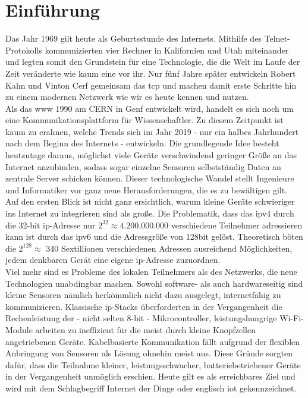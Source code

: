 \section{Einführung}

	Das Jahr 1969 gilt heute als Geburtsstunde des Internets. Mithilfe des Telnet-Protokolls kommunizierten vier Rechner in Kalifornien und Utah miteinander und legten somit den Grundstein für eine Technologie, die die Welt im Laufe der Zeit veränderte wie kaum eine vor ihr. \cite{lmzgeschichte} Nur fünf Jahre später entwickeln Robert Kahn und Vinton Cerf gemeinsam das \ac{tcp} und machen damit erste Schritte hin zu einem modernen Netzwerk wie wir es heute kennen und nutzen.\\
	Als das \ac{www} 1990 am CERN in Genf entwickelt wird, handelt es sich noch um eine Kommunikationsplattform für Wissenschaftler. Zu diesem Zeitpunkt ist kaum zu erahnen, welche Trends sich im Jahr 2019 - nur ein halbes Jahrhundert nach dem Beginn des Internets - entwickeln. Die grundlegende Idee besteht heutzutage daraus, möglichst viele Geräte verschwindend geringer Größe an das Internet anzubinden, sodass sogar einzelne Sensoren selbstständig Daten an zentrale Server schicken können. Dieser technologische Wandel stellt Ingenieure und Informatiker vor ganz neue Herausforderungen, die es zu bewältigen gilt. \\
	Auf den ersten Blick ist nicht ganz ersichtlich, warum kleine Geräte schwieriger ins Internet zu integrieren sind als große. Die Problematik, dass das \ac{ipv4} durch die 32-bit \ac{ip}-Adresse nur $2^32\approx4.200.000.000$ verschiedene Teilnehmer adressieren kann ist durch das \ac{ipv6} und die Adressgröße von 128bit gelöst. Theoretisch böten die $2^128\approx$ 340 Sextillionen verschiedenen Adressen ausreichend Möglichkeiten, jedem denkbaren Gerät eine eigene \ac{ip}-Adresse zuzuordnen.\\
	Viel mehr sind es Probleme des lokalen Teilnehmers als des Netzwerks, die neue Technologien unabdingbar machen. Sowohl software- als auch hardwareseitig sind kleine Sensoren nämlich herkömmlich nicht dazu ausgelegt, internetfähig zu kommunizieren. Klassische \ac{ip}-Stacks überforderten in der Vergangenheit die Rechenleistung der - nicht selten 8-bit - Mikrocontroller, leistungshungrige Wi-Fi-Module arbeiten zu ineffizient für die meist durch kleine Knopfzellen angetriebenen Geräte. Kabelbasierte Kommunikation fällt aufgrund der flexiblen Anbringung von Sensoren als Lösung ohnehin meist aus. Diese Gründe sorgten dafür, dass die Teilnahme kleiner, leistungsschwacher, batteriebetriebener Geräte in der Vergangenheit unmöglich erschien. Heute gilt es als erreichbares Ziel und wird mit dem Schlagbegriff Internet der Dinge oder englisch \ac{iot} gekennzeichnet.\\
